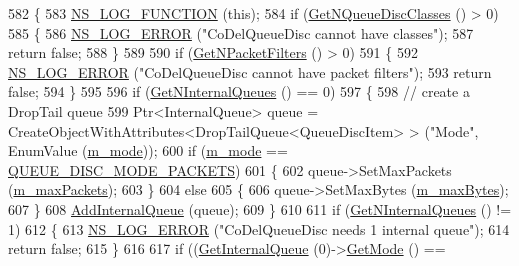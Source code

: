 \begin{DoxyCode}
582 \{
583   \hyperlink{log-macros-disabled_8h_a90b90d5bad1f39cb1b64923ea94c0761}{NS\_LOG\_FUNCTION} (\textcolor{keyword}{this});
584   \textcolor{keywordflow}{if} (\hyperlink{classns3_1_1QueueDisc_a8165c6afde992b073bc4d3bb283ed138}{GetNQueueDiscClasses} () > 0)
585     \{
586       \hyperlink{group__logging_ga0261a8db1d4ac5f79417d117634fd455}{NS\_LOG\_ERROR} (\textcolor{stringliteral}{"CoDelQueueDisc cannot have classes"});
587       \textcolor{keywordflow}{return} \textcolor{keyword}{false};
588     \}
589 
590   \textcolor{keywordflow}{if} (\hyperlink{classns3_1_1QueueDisc_aff24dd5be3fe3aa46b88c00659e09b23}{GetNPacketFilters} () > 0)
591     \{
592       \hyperlink{group__logging_ga0261a8db1d4ac5f79417d117634fd455}{NS\_LOG\_ERROR} (\textcolor{stringliteral}{"CoDelQueueDisc cannot have packet filters"});
593       \textcolor{keywordflow}{return} \textcolor{keyword}{false};
594     \}
595 
596   \textcolor{keywordflow}{if} (\hyperlink{classns3_1_1QueueDisc_a98e658dc1b0b32104ffc9e07afd205c6}{GetNInternalQueues} () == 0)
597     \{
598       \textcolor{comment}{// create a DropTail queue}
599       Ptr<InternalQueue> queue = CreateObjectWithAttributes<DropTailQueue<QueueDiscItem> > (\textcolor{stringliteral}{"Mode"}, 
      EnumValue (\hyperlink{classns3_1_1CoDelQueueDisc_ab7948d66bebfcc5c1ac4e0d47636a068}{m\_mode}));
600       \textcolor{keywordflow}{if} (\hyperlink{classns3_1_1CoDelQueueDisc_ab7948d66bebfcc5c1ac4e0d47636a068}{m\_mode} == \hyperlink{classns3_1_1CoDelQueueDisc_a6149d83cd9f193b54b55efa7309b79eba373e8cb28bf34e16cf0b9b1ed5aee5a0}{QUEUE\_DISC\_MODE\_PACKETS})
601         \{
602           queue->SetMaxPackets (\hyperlink{classns3_1_1CoDelQueueDisc_a806f6d4be982deffa2369d21765ab7ae}{m\_maxPackets});
603         \}
604       \textcolor{keywordflow}{else}
605         \{
606           queue->SetMaxBytes (\hyperlink{classns3_1_1CoDelQueueDisc_aaedc40bf84fcee585be0e9cf3c98f33d}{m\_maxBytes});
607         \}
608       \hyperlink{classns3_1_1QueueDisc_a0599223e2a3976ef042a56c2923a2b61}{AddInternalQueue} (queue);
609     \}
610 
611   \textcolor{keywordflow}{if} (\hyperlink{classns3_1_1QueueDisc_a98e658dc1b0b32104ffc9e07afd205c6}{GetNInternalQueues} () != 1)
612     \{
613       \hyperlink{group__logging_ga0261a8db1d4ac5f79417d117634fd455}{NS\_LOG\_ERROR} (\textcolor{stringliteral}{"CoDelQueueDisc needs 1 internal queue"});
614       \textcolor{keywordflow}{return} \textcolor{keyword}{false};
615     \}
616 
617   \textcolor{keywordflow}{if} ((\hyperlink{classns3_1_1QueueDisc_adf09b498c07c5677c26ea4b8309def74}{GetInternalQueue} (0)->\hyperlink{classns3_1_1CoDelQueueDisc_ab4e1b3733d0961c823b6fa7d2e36c0bb}{GetMode} () == 

\end{DoxyCode}
